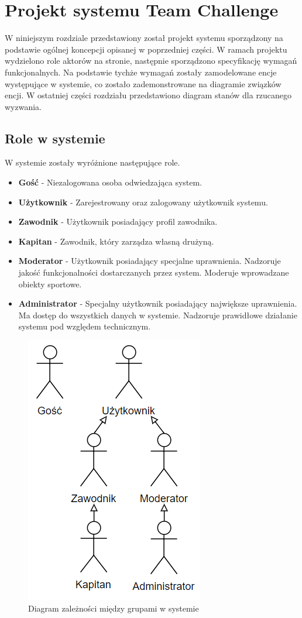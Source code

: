 \chapter{Projekt systemu Team Challenge}

W niniejszym rozdziale przedstawiony został projekt systemu sporządzony na podstawie ogólnej koncepcji opisanej w poprzedniej części. W ramach projektu wydzielono role aktorów na stronie, następnie sporządzono specyfikację wymagań funkcjonalnych. Na podstawie tychże wymagań zostały zamodelowane encje występujące w systemie, co zostało zademonstrowane na diagramie związków encji. W ostatniej części rozdziału przedstawiono diagram stanów dla rzucanego wyzwania.

\section{Role w systemie}

W systemie zostały wyróżnione następujące role. 

\begin{itemize}

\item \textbf{Gość} - Niezalogowana osoba odwiedzająca system.  

\item \textbf{Użytkownik} - Zarejestrowany oraz zalogowany użytkownik systemu.

\item \textbf{Zawodnik} - Użytkownik posiadający profil zawodnika.  

\item \textbf{Kapitan} - Zawodnik, który zarządza własną drużyną. 

\item \textbf{Moderator} - Użytkownik posiadający specjalne uprawnienia. Nadzoruje jakość funkcjonalności dostarczanych przez system. Moderuje wprowadzane obiekty sportowe.    

\item \textbf{Administrator} - Specjalny użytkownik posiadający największe uprawnienia. Ma dostęp do wszystkich danych w systemie. Nadzoruje prawidłowe działanie systemu pod względem technicznym.  

\end{itemize}



\begin{figure}[H]
\centering
\includegraphics[width=0.25\linewidth]{04-projekt/rys/roles.PNG}
\caption{Diagram zależności między grupami w systemie}
\label{fig:diagram-trad-alg-opt}
\end{figure}


